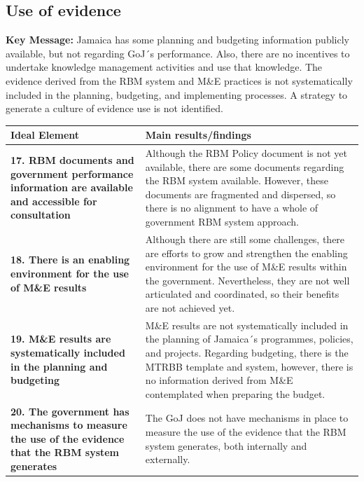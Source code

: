 \documentclass[
  10pt,
]{book}
\begin{document}
\hypertarget{use-of-evidence}{%
\subsection{Use of evidence}\label{use-of-evidence}}

\textbf{Key Message:}
Jamaica has some planning and budgeting information publicly available, but not regarding GoJ´s performance. Also, there are no incentives to undertake knowledge management activities and use that knowledge. The evidence derived from the RBM system and M\&E practices is not systematically included in the planning, budgeting, and implementing processes. A strategy to generate a culture of evidence use is not identified.

\begingroup\fontsize{12}{14}\selectfont

\begin{tabu} to 
\hline
Ideal Element & Main results/findings\\
\hline
\textbf{17. RBM documents and government performance information are available and accessible for consultation} & Although the RBM Policy document is not yet available, there are some documents regarding the RBM system available. However, these documents are fragmented and dispersed, so there is no alignment to have a whole of government RBM system approach.\\
\hline
\textbf{18. There is an enabling environment for the use of M\&E results} & Although there are still some challenges, there are efforts to grow and strengthen the enabling environment for the use of M\&E results within the government. Nevertheless, they are not well articulated and coordinated, so their benefits are not achieved yet.\\
\hline
\textbf{19. M\&E results are systematically included in the planning and budgeting} & M\&E results are not systematically included in the planning of Jamaica´s programmes, policies, and projects. Regarding budgeting, there is the MTRBB template and system, however, there is no information derived from M\&E contemplated when preparing the budget.\\
\hline
\textbf{20. The government has mechanisms to measure the use of the evidence that the RBM system generates} & The GoJ does not have mechanisms in place to measure the use of the evidence that the RBM system generates, both internally and externally.\\
\hline
\end{tabu}
\endgroup{}
\end{document}
